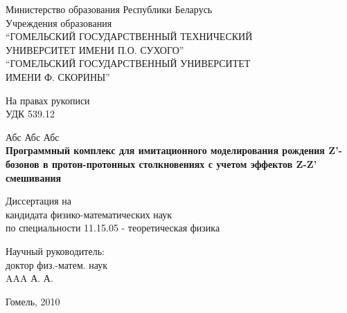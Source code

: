 \begin{titlepage}
	\large
	\begin{center}
		\vspace{3mm}
		Министерство образования Республики Беларусь\\
		Учреждения образования\\
		``ГОМЕЛЬСКИЙ ГОСУДАРСТВЕННЫЙ ТЕХНИЧЕСКИЙ \\
		УНИВЕРСИТЕТ ИМЕНИ П.О. СУХОГО''\\
		``ГОМЕЛЬСКИЙ ГОСУДАРСТВЕННЫЙ УНИВЕРСИТЕТ \\
		ИМЕНИ Ф. СКОРИНЫ''\\
	\end{center}
	\vspace{5mm} На правах рукописи\\
	УДК 539.12 \\
	
	\vspace{2.0cm}
	\begin{center} { Абс Абс Абс} \\
		\vspace{5mm} \textbf{ Программный комплекс для имитационного моделирования рождения Z’-бозонов в протон-протонных столкновениях с учетом эффектов Z-Z’ смешивания
		}
		
		\vspace{30mm} Диссертация на  \\кандидата
		физико-математических наук \\
		по специальности 11.15.05 - теоретическая физика \vspace{3cm}
	\end{center}
	\begin{flushleft}
		\hspace{8cm} Научный руководитель:\\
		\hspace{8cm} доктор физ.-матем. наук\\
		\hspace{8cm} AAA А. А.\\
	\end{flushleft}
	\begin{center}
		\vfill
		Гомель, 2010
	\end{center}
\end{titlepage}
